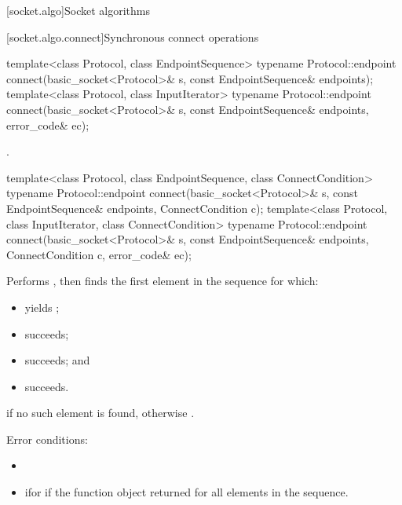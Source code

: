 
[socket.algo]{Socket algorithms}


[socket.algo.connect]{Synchronous connect operations}

\begin{itemdecl}
template<class Protocol, class EndpointSequence>
  typename Protocol::endpoint connect(basic_socket<Protocol>& s,
                                      const EndpointSequence& endpoints);
template<class Protocol, class InputIterator>
  typename Protocol::endpoint connect(basic_socket<Protocol>& s,
                                      const EndpointSequence& endpoints,
                                      error_code& ec);
\end{itemdecl}

\begin{itemdescr}
\pnum
\returns {}.
\end{itemdescr}

\begin{itemdecl}
template<class Protocol, class EndpointSequence, class ConnectCondition>
  typename Protocol::endpoint connect(basic_socket<Protocol>& s,
                                      const EndpointSequence& endpoints,
                                      ConnectCondition c);
template<class Protocol, class InputIterator, class ConnectCondition>
  typename Protocol::endpoint connect(basic_socket<Protocol>& s,
                                      const EndpointSequence& endpoints,
                                      ConnectCondition c, error_code& ec);
\end{itemdecl}

\begin{itemdescr}
\pnum
\effects Performs , then finds the first element  in the sequence  for which:
\begin{itemize}
\item
{}yields ;
\item
{}succeeds;
\item
{}succeeds; and
\item
{} succeeds.
\end{itemize}

\pnum
\returns {} if no such element is found, otherwise .

\pnum
Error conditions: 
\begin{itemize}
\item
{}
\item
 ifor if the function object returned  for all elements in the sequence.
\end{itemize}
\end{itemdescr}

